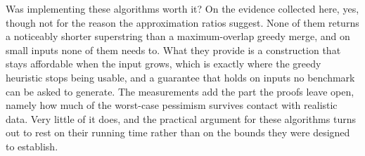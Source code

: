 Was implementing these algorithms worth it? On the evidence collected here,
yes, though not for the reason the approximation ratios suggest. None of
them returns a noticeably shorter superstring than a maximum-overlap greedy
merge, and on small inputs none of them needs to. What they provide is a
construction that stays affordable when the input grows, which is exactly
where the greedy heuristic stops being usable, and a guarantee that holds on
inputs no benchmark can be asked to generate. The measurements add the part
the proofs leave open, namely how much of the worst-case pessimism survives
contact with realistic data. Very little of it does, and the practical
argument for these algorithms turns out to rest on their running time rather
than on the bounds they were designed to establish.
